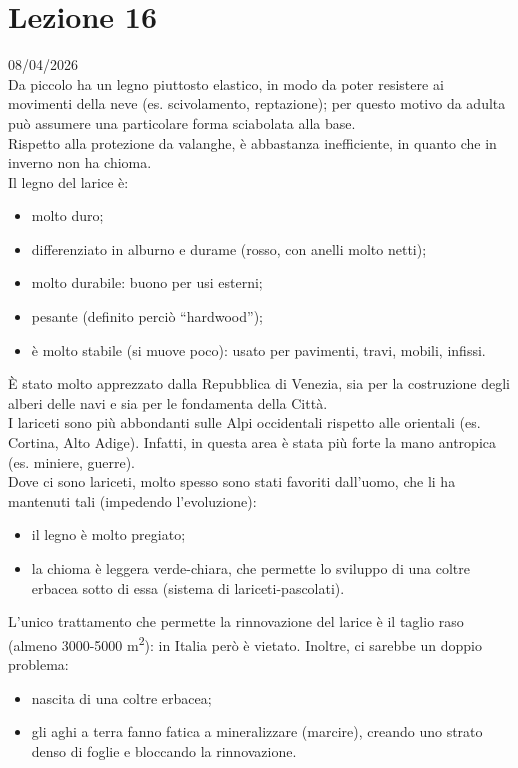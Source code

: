 \section{Lezione 16} \hfill 08/04/2026\\
Da piccolo ha un legno piuttosto elastico, in modo da poter resistere ai movimenti della neve (es. scivolamento, reptazione); per questo motivo da adulta può assumere una particolare forma sciabolata alla base.\\
Rispetto alla protezione da valanghe, è abbastanza inefficiente, in quanto che in inverno non ha chioma.\\
Il legno del larice è:
\begin{itemize}[nosep]
    \item molto duro;
    \item differenziato in alburno e durame (rosso, con anelli molto netti);
    \item molto durabile: buono per usi esterni;
    \item pesante (definito perciò ``hardwood'');
    \item è molto stabile (si muove poco): usato per pavimenti, travi, mobili, infissi.
\end{itemize}
È stato molto apprezzato dalla Repubblica di Venezia, sia per la costruzione degli alberi delle navi e sia per le fondamenta della Città.\\
I lariceti sono più abbondanti sulle Alpi occidentali rispetto alle orientali (es. Cortina, Alto Adige). Infatti, in questa area è stata più forte la mano antropica (es. miniere, guerre).\\
Dove ci sono lariceti, molto spesso sono stati favoriti dall'uomo, che li ha mantenuti tali (impedendo l'evoluzione):
\begin{itemize}[nosep]
    \item il legno è molto pregiato;
    \item la chioma è leggera verde-chiara, che permette lo sviluppo di una coltre erbacea sotto di essa (sistema di lariceti-pascolati).
\end{itemize}
L'unico trattamento che permette la rinnovazione del larice è il taglio raso (almeno 3000-5000 \unit{m^2}): in Italia però è vietato. Inoltre, ci sarebbe un doppio problema:
\begin{itemize}[nosep]
    \item nascita di una coltre erbacea;
    \item gli aghi a terra fanno fatica a mineralizzare (marcire), creando uno strato denso di foglie e bloccando la rinnovazione.
\end{itemize}
